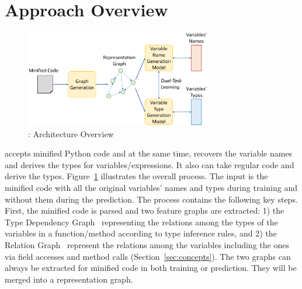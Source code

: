 \section{Approach Overview}


\begin{figure}[t]
	\begin{center}
	  \includegraphics[width=3.2in]{figures/overview-2.png}
          \vspace{-8pt}
		\caption{{\tool}: Architecture Overview}
		\label{overview}
	\end{center}
\end{figure}



{\tool} accepts minified Python code and at the same time, recovers
the variable names and derives the types for variables/expressions. It
also can take regular code and derive the types.
%
Figure~\ref{overview} illustrates the overall process. The input is
the minified code with all the original variables' names and types
during training and without them during the prediction.
%
The process contains the following key steps. First, the minified code
is parsed and two feature graphs are extracted: 1) the Type Dependency
Graph~\cite{HiTyper-icse22} representing the relations among the
types of the variables in a function/method according to type
inference rules, and 2) the Relation Graph~\cite{icse19} represent the
relations among the variables including the ones via field accesses
and method calls (Section~\ref{sec:concepts}). The two graphs can
always be extracted for minified code in both training or
prediction. They will be merged into a representation graph.

